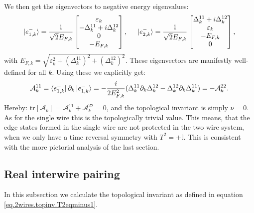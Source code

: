 We then get the eigenvectors to negative energy eigenvalues:
\begin{equation}
\ket{e^{-}_{1,k}} = \frac{1}{\sqrt{2}E_{F,k}}\begin{bmatrix} \varepsilon_k \\ -\Delta^{11}_k + i\Delta^{12}_k \\ 0 \\ -E_{F,k} \end{bmatrix}, \hspace{0.5cm} \ket{e^{-}_{2,k}} = \frac{1}{\sqrt{2}E_{F,k}}\begin{bmatrix} \Delta^{11}_k + i\Delta^{12}_k \\ \varepsilon_k \\  -E_{F,k} \\ 0 \end{bmatrix},
\end{equation}
with $E_{F,k} = \sqrt{\varepsilon_k^2 + (\Delta^{11}_k)^2 + (\Delta^{12}_k)^2}$. These eigenvectors are manifestly well-defined for all $k$. Using these we explicitly get:
\begin{equation}
\mathcal{A}^{11}_k = \bra{e^{-}_{1,k}}\partial_k\ket{e^{-}_{1,k}} = -\frac{i}{2E_{F,k}^2}(\Delta^{11}_k\partial_k\Delta^{12}_k - \Delta^{12}_k\partial_k\Delta^{11}_k) = -\mathcal{A}^{22}_k. \nonumber
\end{equation}
Hereby: $\text{tr}[\mathcal{A}_k] = \mathcal{A}^{11}_k  + \mathcal{A}^{22}_k = 0$, and the topological invariant is simply $\nu = 0$. As for the single wire this is the topologically trivial value. This means, that the edge states formed in the single wire are not protected in the two wire system, when we only have a time reversal symmetry with $T^2 = +\mathbb{I}$. This is consistent with the more pictorial analysis of the last section. 

\subsection{Real interwire pairing}
\label{subsec.2wires_CSinv_Delta12real}
In this subsection we calculate the topological invariant as defined in equation \eqref{eq.2wires.topinv.T2eqminus1}. 


